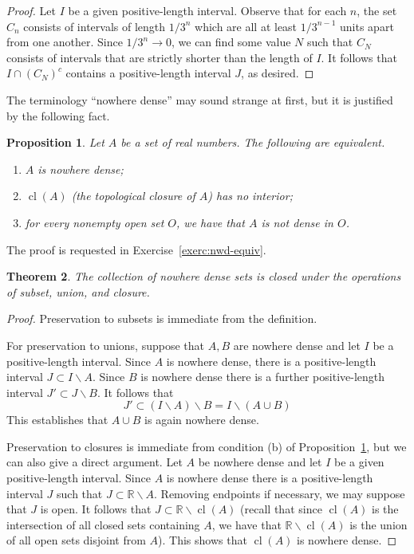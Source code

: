 \documentclass[11pt,oneside,a4paper]{amsbook}
\newcommand{\R}{\mathbb R}
\DeclareMathOperator{\cl}{cl}
\theoremstyle{definition}
\theoremstyle{plain}
\newtheorem{theorem}{Theorem}[section]
\newtheorem{proposition}[theorem]{Proposition}
\theoremstyle{definition}
\theoremstyle{remark}
\numberwithin{equation}{section}
\numberwithin{figure}{section}
\begin{document}
\begin{proof}
  Let $I$ be a given positive-length interval. Observe that for each $n$, the set $C_n$ consists of intervals of length $1/3^n$ which are all at least $1/3^{n-1}$ units apart from one another. Since $1/3^n\to0$, we can find some value $N$ such that $C_N$ consists of intervals that are strictly shorter than the length of $I$. It follows that $I\cap (C_N)^c$ contains a positive-length interval $J$, as desired.
\end{proof}

The terminology ``nowhere dense'' may sound strange at first, but it is justified by the following fact.

\begin{proposition}
  \label{prop:nwd-equiv}
  Let $A$ be a set of real numbers. The following are equivalent.
  \begin{enumerate}
    \item $A$ is nowhere dense;
    \item $\cl(A)$ (the topological closure of $A$) has no interior;
    \item for every nonempty open set $O$, we have that $A$ is not dense in $O$.
  \end{enumerate}
\end{proposition}

The proof is requested in Exercise~\ref{exerc:nwd-equiv}.

\begin{theorem}
  The collection of nowhere dense sets is closed under the operations of subset, union, and closure.
\end{theorem}

\begin{proof}
  Preservation to subsets is immediate from the definition.

  For preservation to unions, suppose that $A,B$ are nowhere dense and let $I$ be a positive-length interval. Since $A$ is nowhere dense, there is a positive-length interval $J\subset I\smallsetminus A$. Since $B$ is nowhere dense there is a further positive-length interval $J'\subset J\smallsetminus B$. It follows that
  \[J'\subset (I\smallsetminus A)\smallsetminus B=I\smallsetminus (A\cup B)
  \]
  This establishes that $A\cup B$ is again nowhere dense.

  Preservation to closures is immediate from condition (b) of Proposition~\ref{prop:nwd-equiv}, but we can also give a direct argument. Let $A$ be nowhere dense and let $I$ be a given positive-length interval. Since $A$ is nowhere dense there is a positive-length interval $J$ such that $J\subset\R\smallsetminus A$. Removing endpoints if necessary, we may suppose that $J$ is open. It follows that $J\subset\R\smallsetminus\cl(A)$ (recall that since $\cl(A)$ is the intersection of all closed sets containing $A$, we have that $\R\smallsetminus\cl(A)$ is the union of all open sets disjoint from $A$). This shows that $\cl(A)$ is nowhere dense.
\end{proof}
\end{document}
